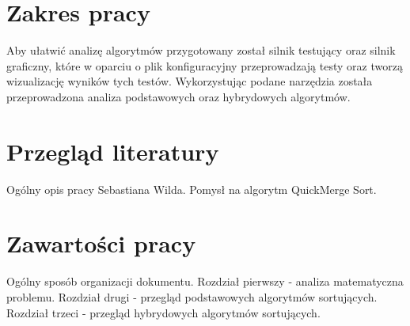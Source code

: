 
\section{Zakres pracy}
Aby ułatwić analizę algorytmów przygotowany został silnik testujący oraz silnik graficzny, które w oparciu o plik
konfiguracyjny przeprowadzają testy oraz tworzą wizualizację wyników tych testów. Wykorzystując podane narzędzia
została przeprowadzona analiza podstawowych oraz hybrydowych algorytmów.

\section{Przegląd literatury}
Ogólny opis pracy Sebastiana Wilda. Pomysł na algorytm QuickMerge Sort.

\section{Zawartości pracy}
Ogólny sposób organizacji dokumentu.
Rozdział pierwszy - analiza matematyczna problemu.
Rozdział drugi - przegląd podstawowych algorytmów sortujących.
Rozdział trzeci - przegląd hybrydowych algorytmów sortujących.